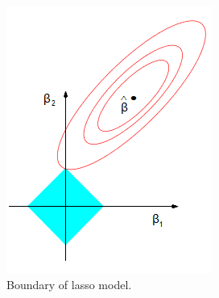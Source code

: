 \begin  {figure}[!htpb]
\centering
  \includegraphics[width=0.5\linewidth]{Credit_Images/Lasso-regression.png}
   \caption{Boundary of lasso model.\cite{Hastie2009ThePrediction}}
    \label{fig-lasso}
\end{figure}

